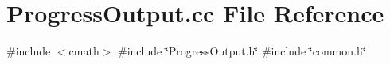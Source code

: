 \section{Progress\+Output.\+cc File Reference}
\label{ProgressOutput_8cc}
{\ttfamily \#include $<$cmath$>$}\newline
{\ttfamily \#include \char`\"{}Progress\+Output.\+h\char`\"{}}\newline
{\ttfamily \#include \char`\"{}common.\+h\char`\"{}}\newline
